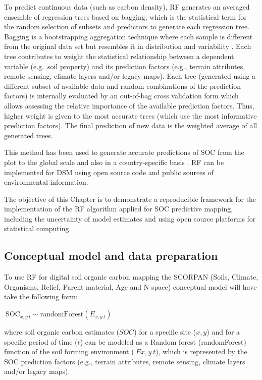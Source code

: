 \documentclass[10pt,b5paper,]{book}
\theoremstyle{definition}
\theoremstyle{definition}
\theoremstyle{definition}
\theoremstyle{remark}
\begin{document}
To predict continuous data (such as carbon density), RF generates an
averaged ensemble of regression trees based on bagging, which is the
statistical term for the random selection of subsets and predictors to
generate each regression tree. Bagging is a bootstrapping aggregation
technique where each sample is different from the original data set but
resembles it in distribution and variability
\citep{Breiman2001, Breiman1996}. Each tree contributes to weight the
statistical relationship between a dependent variable (e.g.~soil
property) and its prediction factors (e.g., terrain attributes, remote
sensing, climate layers and/or legacy maps). Each tree (generated using
a different subset of available data and random combinations of the
prediction factors) is internally evaluated by an out-of-bag cross
validation form which allows assessing the relative importance of the
available prediction factors. Thus, higher weight is given to the most
accurate trees (which use the most informative prediction factors). The
final prediction of new data is the weighted average of all generated
trees.

This method has been used to generate accurate predictions of SOC from
the plot to the global scale and also in a country-specific basis
\citep{hengl2014soilgrids1km, hengl2017, Bonfatti2016, guevara_2018}. RF
can be implemented for DSM using open source code \citep[e.g.,
\textbf{R} package \textbf{randomForest}, see][]{breiman2017cutler} and
public sources of environmental information.

The objective of this Chapter is to demonstrate a reproducible framework
for the implementation of the RF algorithm applied for SOC predictive
mapping, including the uncertainty of model estimates and using open
source platforms for statistical computing.

\hypertarget{conceptual-model-and-data-preparation}{%
\subsection{Conceptual model and data
preparation}\label{conceptual-model-and-data-preparation}}

To use RF for digital soil organic carbon mapping the SCORPAN (Soils,
Climate, Organisms, Relief, Parent material, Age and N space) conceptual
model \citep{mcbratney2003digital, Florinsky2012} will have take the
following form:

\(\ \text{SOC}_{x,y~t} \sim \text{randomForest} (E_{x,y~t})\)

where soil organic carbon estimates (\(SOC\)) for a specific site
(\(x,y\)) and for a specific period of time (\(t\)) can be modeled as a
Random forest (randomForest) function of the soil forming environment
(\(\ Ex,y~t\)), which is represented by the SOC prediction factors
(e.g., terrain attributes, remote sensing, climate layers and/or legacy
maps).
\end{document}
